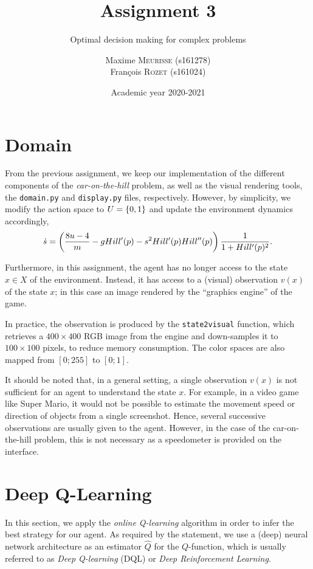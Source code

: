 \documentclass[a4paper, 12pt]{article}
\institute{University of Liège}
\title{Assignment 3}
\subtitle{Optimal decision making for complex problems}
\author{%
Maxime \textsc{Meurisse} (s161278)\\%
François \textsc{Rozet} (s161024)%
}
\date{Academic year 2020-2021}
\begin{document}
    \maketitle
    
    \section{Domain}
    
    From the previous assignment, we keep our implementation of the different components of the \emph{car-on-the-hill} problem, as well as the visual rendering tools, \ie{} the \texttt{domain.py} and \texttt{display.py} files, respectively. However, by simplicity, we modify the action space to $U = \left\{0, 1\right\}$ and update the environment dynamics accordingly, \ie{}
    $$ \dot{s} = \left(\frac{8 u - 4}{m} - g Hill'(p) - s^2 Hill'(p) Hill''(p) \right) \frac{1}{1 + Hill'(p)^2} .$$
    
    Furthermore, in this assignment, the agent has no longer access to the state $x \in X$ of the environment. Instead, it has access to a (visual) observation $v(x)$ of the state $x$; in this case an image rendered by the \enquote{graphics engine} of the game.
    
    In practice, the observation is produced by the \texttt{state2visual} function, which retrieves a $400 \times 400$ RGB image from the engine and down-samples it to $100 \times 100$ pixels, to reduce memory consumption. The color spaces are also mapped from $[0; 255]$ to $[0; 1]$.
    
    It should be noted that, in a general setting, a single observation $v(x)$ is not sufficient for an agent to understand the state $x$. For example, in a video game like Super Mario, it would not be possible to estimate the movement speed or direction of objects from a single screenshot. Hence, several successive observations are usually given to the agent. However, in the case of the car-on-the-hill problem, this is not necessary as a speedometer is provided on the interface.
    
    \section{Deep Q-Learning} \label{sec:dql}
    
    In this section, we apply the \emph{online Q-learning} algorithm in order to infer the best strategy for our agent. As required by the statement, we use a (deep) neural network architecture as an estimator $\hat{Q}$ for the $Q$-function, which is usually referred to as \emph{Deep Q-learning} (DQL) or \emph{Deep Reinforcement Learning}.
    
\end{document}

